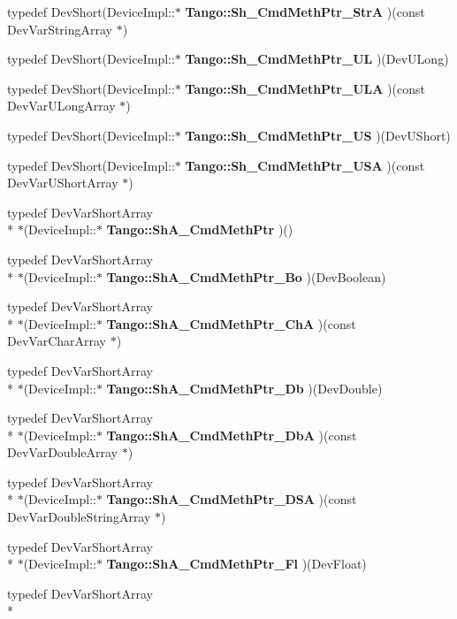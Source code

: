 \begin{DoxyCompactItemize}
\item 
typedef Dev\-Short(Device\-Impl\-::$\ast$ {\bf Tango\-::\-Sh\-\_\-\-Cmd\-Meth\-Ptr\-\_\-\-Str\-A} )(const Dev\-Var\-String\-Array $\ast$)
\item 
typedef Dev\-Short(Device\-Impl\-::$\ast$ {\bf Tango\-::\-Sh\-\_\-\-Cmd\-Meth\-Ptr\-\_\-\-U\-L} )(Dev\-U\-Long)
\item 
typedef Dev\-Short(Device\-Impl\-::$\ast$ {\bf Tango\-::\-Sh\-\_\-\-Cmd\-Meth\-Ptr\-\_\-\-U\-L\-A} )(const Dev\-Var\-U\-Long\-Array $\ast$)
\item 
typedef Dev\-Short(Device\-Impl\-::$\ast$ {\bf Tango\-::\-Sh\-\_\-\-Cmd\-Meth\-Ptr\-\_\-\-U\-S} )(Dev\-U\-Short)
\item 
typedef Dev\-Short(Device\-Impl\-::$\ast$ {\bf Tango\-::\-Sh\-\_\-\-Cmd\-Meth\-Ptr\-\_\-\-U\-S\-A} )(const Dev\-Var\-U\-Short\-Array $\ast$)
\item 
typedef Dev\-Var\-Short\-Array \\*
$\ast$(Device\-Impl\-::$\ast$ {\bf Tango\-::\-Sh\-A\-\_\-\-Cmd\-Meth\-Ptr} )()
\item 
typedef Dev\-Var\-Short\-Array \\*
$\ast$(Device\-Impl\-::$\ast$ {\bf Tango\-::\-Sh\-A\-\_\-\-Cmd\-Meth\-Ptr\-\_\-\-Bo} )(Dev\-Boolean)
\item 
typedef Dev\-Var\-Short\-Array \\*
$\ast$(Device\-Impl\-::$\ast$ {\bf Tango\-::\-Sh\-A\-\_\-\-Cmd\-Meth\-Ptr\-\_\-\-Ch\-A} )(const Dev\-Var\-Char\-Array $\ast$)
\item 
typedef Dev\-Var\-Short\-Array \\*
$\ast$(Device\-Impl\-::$\ast$ {\bf Tango\-::\-Sh\-A\-\_\-\-Cmd\-Meth\-Ptr\-\_\-\-Db} )(Dev\-Double)
\item 
typedef Dev\-Var\-Short\-Array \\*
$\ast$(Device\-Impl\-::$\ast$ {\bf Tango\-::\-Sh\-A\-\_\-\-Cmd\-Meth\-Ptr\-\_\-\-Db\-A} )(const Dev\-Var\-Double\-Array $\ast$)
\item 
typedef Dev\-Var\-Short\-Array \\*
$\ast$(Device\-Impl\-::$\ast$ {\bf Tango\-::\-Sh\-A\-\_\-\-Cmd\-Meth\-Ptr\-\_\-\-D\-S\-A} )(const Dev\-Var\-Double\-String\-Array $\ast$)
\item 
typedef Dev\-Var\-Short\-Array \\*
$\ast$(Device\-Impl\-::$\ast$ {\bf Tango\-::\-Sh\-A\-\_\-\-Cmd\-Meth\-Ptr\-\_\-\-Fl} )(Dev\-Float)
\item 
typedef Dev\-Var\-Short\-Array \\*

\end{DoxyCompactItemize}
